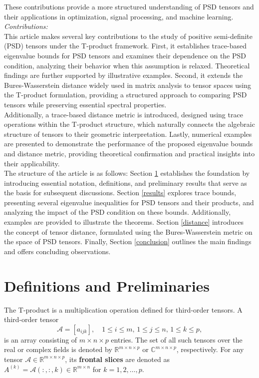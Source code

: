 \documentclass[oupthm]{CUP-JNL-BCM}%
\theoremstyle{oupplain}
\theoremstyle{oupdefinition}
\theoremstyle{oupremark}
\theoremstyle{oupproof}
\numberwithin{equation}{section}
\begin{document}
\noindent These contributions provide a more structured understanding of PSD tensors and their applications in optimization, signal processing, and machine learning.\\[-1ex]

\noindent \emph{Contributions:~}\\This article makes several key contributions to the study of positive semi-definite (PSD) tensors under the T-product framework. First, it establishes trace-based eigenvalue bounds for PSD tensors and examines their dependence on the PSD condition, analyzing their behavior when this assumption is relaxed. Theoretical findings are further supported by illustrative examples. Second, it extends the Bures-Wasserstein distance widely used in matrix analysis to tensor spaces using the T-product formulation, providing a structured approach to comparing PSD tensors while preserving essential spectral properties.\\[-1ex]

\noindent Additionally, a trace-based distance metric is introduced, designed using trace operations within the T-product structure, which naturally connects the algebraic structure of tensors to their geometric interpretation. Lastly, numerical examples are presented to demonstrate the performance of the proposed eigenvalue bounds and distance metric, providing theoretical confirmation and practical insights into their applicability.\\

\noindent The structure of the article is as follows: Section \ref{def} establishes the foundation by introducing essential notation, definitions, and preliminary results that serve as the basis for subsequent discussions. Section \ref{results} explores trace bounds, presenting several eigenvalue inequalities for PSD tensors and their products, and analyzing the impact of the PSD condition on these bounds. Additionally, examples are provided to illustrate the theorems. Section \ref{distance} introduces the concept of tensor distance, formulated using the Bures-Wasserstein metric on the space of PSD tensors. Finally, Section \ref{conclusion} outlines the main findings and offers concluding observations.


\section{Definitions and Preliminaries}\label{def}

The T-product is a multiplication operation defined for third-order tensors. A third-order tensor  
\[
\mathcal{A} = \left[a_{i j k}\right], \quad 1 \leq i \leq m, \, 1 \leq j \leq n, \, 1 \leq k \leq p,
\]
is an array consisting of \(m \times n \times p\) entries. The set of all such tensors over the real or complex fields is denoted by \(\mathbb{R}^{m \times n \times p}\) or \(\mathbb{C}^{m \times n \times p}\), respectively. For any tensor \(\mathcal{A} \in \mathbb{R}^{m \times n \times p}\), its \textbf{frontal slices} are denoted as \(A^{(k)} = \mathcal{A}(:, :, k) \in \mathbb{R}^{m \times n}\) for \(k = 1, 2, \ldots, p\).\\  
\end{document}
